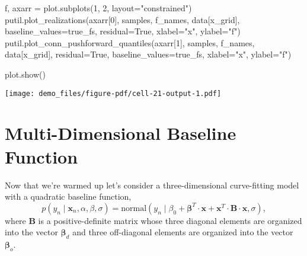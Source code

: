 \documentclass[
  letterpaper,
  DIV=11,
  numbers=noendperiod]{scrartcl}
\newenvironment{Shaded}{\begin{snugshade}}{\end{snugshade}}
\newcommand{\DecValTok}[1]{\textcolor[rgb]{0.68,0.00,0.00}{#1}}
\newcommand{\NormalTok}[1]{\textcolor[rgb]{0.00,0.23,0.31}{#1}}
\newcommand{\OperatorTok}[1]{\textcolor[rgb]{0.37,0.37,0.37}{#1}}
\newcommand{\StringTok}[1]{\textcolor[rgb]{0.13,0.47,0.30}{#1}}
\newcommand{\VariableTok}[1]{\textcolor[rgb]{0.07,0.07,0.07}{#1}}
\begin{document}
\begin{Shaded}
\begin{Highlighting}[]
\NormalTok{f, axarr }\OperatorTok{=}\NormalTok{ plot.subplots(}\DecValTok{1}\NormalTok{, }\DecValTok{2}\NormalTok{, layout}\OperatorTok{=}\StringTok{"constrained"}\NormalTok{)}
\NormalTok{putil.plot\_realizations(axarr[}\DecValTok{0}\NormalTok{], samples,}
\NormalTok{                        f\_names, data[}\StringTok{\textquotesingle{}x\_grid\textquotesingle{}}\NormalTok{],}
\NormalTok{                        baseline\_values}\OperatorTok{=}\NormalTok{true\_fs,}
\NormalTok{                        residual}\OperatorTok{=}\VariableTok{True}\NormalTok{,}
\NormalTok{                        xlabel}\OperatorTok{=}\StringTok{"x"}\NormalTok{, ylabel}\OperatorTok{=}\StringTok{"f"}\NormalTok{)}
\NormalTok{putil.plot\_conn\_pushforward\_quantiles(axarr[}\DecValTok{1}\NormalTok{], samples,}
\NormalTok{                                      f\_names, data[}\StringTok{\textquotesingle{}x\_grid\textquotesingle{}}\NormalTok{],}
\NormalTok{                                      residual}\OperatorTok{=}\VariableTok{True}\NormalTok{,}
\NormalTok{                                      baseline\_values}\OperatorTok{=}\NormalTok{true\_fs,}
\NormalTok{                                      xlabel}\OperatorTok{=}\StringTok{"x"}\NormalTok{, ylabel}\OperatorTok{=}\StringTok{"f"}\NormalTok{)}

\NormalTok{plot.show()}
\end{Highlighting}
\end{Shaded}

\texttt{[image: demo\_files/figure-pdf/cell-21-output-1.pdf]}

\section{Multi-Dimensional Baseline
Function}\label{multi-dimensional-baseline-function}

Now that we're warmed up let's consider a three-dimensional
curve-fitting model with a quadratic baseline function, \[
p(y_{n} \mid \mathbf{x}_{n}, \alpha, \beta, \sigma)
=
\text{normal}(y_{n}   \mid \beta_{0}
                    + \boldsymbol{\beta}^{T} \cdot \mathbf{x}
                    + \mathbf{x}^{T} \cdot \mathbf{B} \cdot \mathbf{x}, \sigma),
\] where \(\mathbf{B}\) is a positive-definite matrix whose three
diagonal elements are organized into the vector
\(\boldsymbol{\beta}_{d}\) and three off-diagonal elements are organized
into the vector \(\boldsymbol{\beta}_{o}\).
\end{document}
